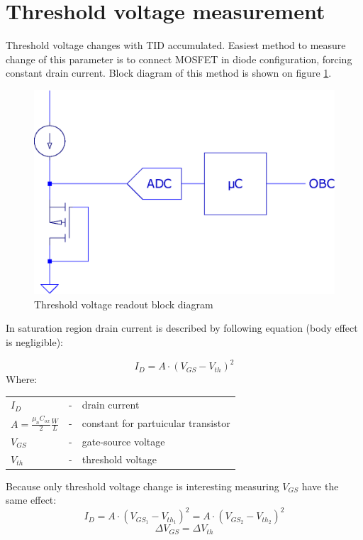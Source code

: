 \section{Threshold voltage measurement}
    Threshold voltage changes with TID accumulated. Easiest method to measure change of this parameter is to connect MOSFET in diode configuration, forcing constant drain current. Block diagram of this method is shown on figure \ref{Vth_readout_block_diagram}.

    \begin{figure}[H]
        \centering
        \includegraphics[width=0.3\paperwidth]{img/05/conceptual_block_diagram.eps}
        \caption{Threshold voltage readout block diagram}
        \label{Vth_readout_block_diagram}
    \end{figure}

    In saturation region drain current is described by following equation (body effect is negligible):

    $$I_D = A \cdot (V_{GS} - V_{th})^2$$
    Where:

    \begin{tabular}{lcl}
        $I_D$ & - & drain current \\
        $A = \frac{\mu_n C_{ox}}{2} \frac{W}{L}$ & - & constant for partuicular transistor \\
        $V_{GS}$ & - & gate-source voltage \\
        $V_{th}$ & - & threshold voltage \\
    \end{tabular}
    \bigskip

    Because only threshold voltage change is interesting measuring $V_{GS}$ have the same effect:
    $$I_D = A \cdot (V_{GS_1} - V_{th_1})^2 = A \cdot (V_{GS_2} - V_{th_2})^2$$
    $$\Delta V_{GS} = \Delta V_{th}$$

